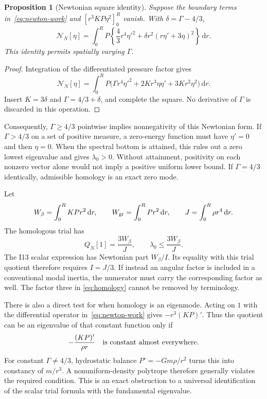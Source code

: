 \documentclass[11pt,letterpaper]{article}
\newcommand{\dd}{\,\mathrm d}
\newtheorem{proposition}[theorem]{Proposition}
\theoremstyle{definition}
\numberwithin{equation}{section}
\begin{document}
\begin{proposition}[Newtonian square identity]
Suppose the boundary terms in~\eqref{eq:newton-work} and
$[r^3KP\eta^2]_0^R$ vanish. With $\delta=\Gamma-4/3$,
\begin{equation}
 \mathcal N_N[\eta]
 =\int_0^R P\left\{\frac43r^4\eta'^2
       +\delta r^2(r\eta'+3\eta)^2\right\}\dd r.
 \label{eq:newton-square}
\end{equation}
This identity permits spatially varying $\Gamma$.
\end{proposition}
\begin{proof}
Integration of the differentiated pressure factor gives
\[
 \mathcal N_N[\eta]=\int_0^R P
  \bigl(\Gamma r^4\eta'^2+2Kr^3\eta\eta'+3Kr^2\eta^2\bigr)\dd r.
\]
Insert $K=3\delta$ and $\Gamma=4/3+\delta$, and complete the square.
No derivative of $\Gamma$ is discarded in this operation.
\end{proof}

Consequently, $\Gamma\ge4/3$ pointwise implies nonnegativity of this
Newtonian form. If $\Gamma>4/3$ on a set of positive measure, a zero-energy
function must have $\eta'=0$ and then $\eta=0$. When the spectral bottom
is attained, this rules out a zero lowest eigenvalue and gives
$\lambda_0>0$. Without attainment, positivity on each nonzero vector alone
would not imply a positive uniform lower bound. If $\Gamma=4/3$
identically, admissible homology is an exact zero mode.

Let
\begin{equation}
 W_\beta=\int_0^R KP r^2\dd r,\qquad
 W_{\rm gr}=\int_0^R P r^2\dd r,\qquad
 J=\int_0^R\rho r^4\dd r.
 \label{eq:moments}
\end{equation}
The homologous trial has
\begin{equation}
 Q_N[1]=\frac{3W_\beta}{J},\qquad
 \lambda_0\le\frac{3W_\beta}{J}.
 \label{eq:homology}
\end{equation}
The I13 scalar expression has Newtonian part $W_\beta/I$. Its equality
with this trial quotient therefore requires $I=J/3$. If instead an angular
factor is included in a conventional modal inertia, the numerator must
carry the corresponding factor as well. The factor three in
\eqref{eq:homology} cannot be removed by terminology.

There is also a direct test for when homology is an eigenmode. Acting on
$1$ with the differential operator in~\eqref{eq:newton-work} gives
$-r^3(KP)'$. Thus the quotient can be an eigenvalue of that constant
function only if
\begin{equation}
 -\frac{(KP)'}{\rho r}\quad\hbox{is constant almost everywhere.}
 \label{eq:homology-residual}
\end{equation}
For constant $\Gamma\ne4/3$, hydrostatic balance
$P'=-Gm\rho/r^2$ turns this into constancy of $m/r^3$. A nonuniform-density
polytrope therefore generally violates the required condition. This is an
exact obstruction to a universal identification of the scalar trial
formula with the fundamental eigenvalue.
\end{document}
